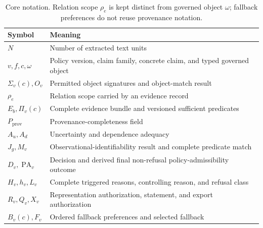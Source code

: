 \documentclass[manuscript,screen,review]{acmart}
\begin{document}
\begin{table}[t]
  \caption{Core notation. Relation scope $\rho_e$ is kept distinct from governed object $\omega$; fallback preferences do not reuse provenance notation.}
  \label{tab:notation}
  \centering
  \small
  \begin{tabular}{@{}lp{}@{}}
    \toprule
    Symbol & Meaning \\
    \midrule
    $N$ & Number of extracted text units \\
    $v,f,c,\omega$ & Policy version, claim family, concrete claim, and typed governed object \\
    $\Sigma_v(c),O_v$ & Permitted object signatures and object-match result \\
    $\rho_e$ & Relation scope carried by an evidence record \\
    $E_b,\Pi_v(c)$ & Complete evidence bundle and versioned sufficient predicates \\
    $P_{\mathrm{prov}}$ & Provenance-completeness field \\
    $A_u,A_d$ & Uncertainty and dependence adequacy \\
    $J_g,M_v$ & Observational-identifiability result and complete predicate match \\
    $D_v,\operatorname{PA}_v$ & Decision and derived final non-refusal policy-admissibility outcome \\
    $H_v,h_v,L_v$ & Complete triggered reasons, controlling reason, and refusal class \\
    $R_v,Q_v,X_v$ & Representation authorization, statement, and export authorization \\
    $B_v(c),F_v$ & Ordered fallback preferences and selected fallback \\
    \bottomrule
  \end{tabular}
\end{table}
\end{document}
